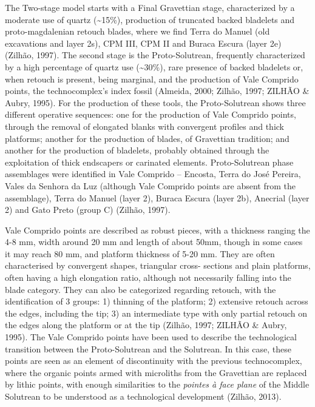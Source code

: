\documentclass[12pt,twoside]{reedthesis}
\begin{document}
The Two-stage model starts with a Final Gravettian stage, characterized by a moderate use of quartz (\textasciitilde15\%), production of truncated backed bladelets and proto-magdalenian retouch blades, where we find Terra do Manuel (old excavations and layer 2s), CPM III, CPM II and Buraca Escura (layer 2e) (Zilhão, 1997). The second stage is the Proto-Solutrean, frequently characterized by a high percentage of quartz use (\textasciitilde30\%), rare presence of backed bladelets or, when retouch is present, being marginal, and the production of Vale Comprido points, the technocomplex's index fossil (Almeida, 2000; Zilhão, 1997; ZILHÃO \& Aubry, 1995). For the production of these tools, the Proto-Solutrean shows three different operative sequences: one for the production of Vale Comprido points, through the removal of elongated blanks with convergent profiles and thick platforms; another for the production of blades, of Gravettian tradition; and another for the production of bladelets, probably obtained through the exploitation of thick endscapers or carinated elements. Proto-Solutrean phase assemblages were identified in Vale Comprido -- Encosta, Terra do José Pereira, Vales da Senhora da Luz (although Vale Comprido points are absent from the assemblage), Terra do Manuel (layer 2), Buraca Escura (layer 2b), Anecrial (layer 2) and Gato Preto (group C) (Zilhão, 1997).

Vale Comprido points are described as robust pieces, with a thickness ranging the 4-8 mm, width around 20 mm and length of about 50mm, though in some cases it may reach 80 mm, and platform thickness of 5-20 mm. They are often characterised by convergent shapes, triangular cross- sections and plain platforms, often having a high elongation ratio, although not necessarily falling into the blade category. They can also be categorized regarding retouch, with the identification of 3 groups: 1) thinning of the platform; 2) extensive retouch across the edges, including the tip; 3) an intermediate type with only partial retouch on the edges along the platform or at the tip (Zilhão, 1997; ZILHÃO \& Aubry, 1995). The Vale Comprido points have been used to describe the technological transition between the Proto-Solutrean and the Solutrean. In this case, these points are seen as an element of discontinuity with the previous technocomplex, where the organic points armed with microliths from the Gravettian are replaced by lithic points, with enough similarities to the \emph{pointes à face plane} of the Middle Solutrean to be understood as a technological development (Zilhão, 2013).
\end{document}
